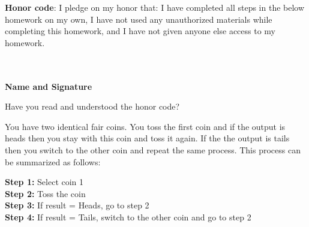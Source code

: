 \documentclass[solution,addpoints,12pt]{exam}
\begin{document}
\noindent \textbf{Honor code}: I pledge on my honor that: I have completed all steps in the below homework on my own, I have not used any unauthorized materials while completing this homework, and I have not given anyone else access to my homework.
\\~\\~\\
\begin{flushright}
\textbf{Name and Signature}

\end{flushright}


\begin{questions}

\question[1] Have you read and understood the honor code?
\begin{solution}

\end{solution}

\question You have two identical fair coins. You toss the first coin and if the output is heads then you stay with this coin and toss it again. If the the output is tails then you switch to the other coin and repeat the same process. This process can be summarized as follows:

\textbf{Step 1:} Select coin 1 \\
\textbf{Step 2:} Toss the coin \\
\textbf{Step 3:} If result = Heads, go to step 2 \\
\textbf{Step 4:} If result = Tails, switch to the other coin and go to step 2

\end{questions}
\end{document}

